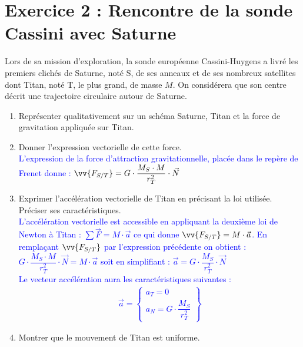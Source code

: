\documentclass[a4paper,12pt]{article}
\begin{document}
\section*{Exercice 2 : Rencontre de la sonde Cassini avec Saturne}
Lors de sa mission d'exploration, la sonde européenne Cassini-Huygens a livré les premiers clichés de Saturne, noté S, de ses anneaux et de ses nombreux satellites dont Titan, noté T, le plus grand, de masse $M$. On considérera que son centre décrit une trajectoire circulaire autour de Saturne.
\begin{enumerate}
	\item Représenter qualitativement sur un schéma Saturne, Titan et la force de gravitation appliquée sur Titan.\\
	\item Donner l'expression vectorielle de cette force.\\
\textcolor{blue}{L'expression de la force d'attraction gravitationnelle, placée dans le repère de Frenet donne : $\vv{F_{S/T}} = G \cdot \dfrac{M_S \cdot M}{r_T^2} \cdot \vec{N}$}
	\item Exprimer l'accélération vectorielle de Titan en précisant la loi utilisée. Préciser ses caractéristiques.\\
\textcolor{blue}{L'accélération vectorielle est accessible en appliquant la deuxième loi de Newton à Titan : $\sum \vec{F}= M \cdot \vec{a}$ ce qui donne $\vv{F_{S/T}}= M \cdot \vec{a}$. En remplaçant $\vv{F_{S/T}}$ par l'expression précédente on obtient : $G \cdot \dfrac{M_S \cdot M}{r_T^2} \cdot \vec{N} = M \cdot \vec{a}$ soit en simplifiant : $\vec{a} = G \cdot \dfrac{M_S }{r_T^2} \cdot \vec{N}$\\
Le vecteur accélération aura les caractéristiques suivantes : 
\begin{eqnarray}
	\vec{a} = \left\lbrace
	\begin{array}{l}
	a_T = 0\\
	a_N = G \cdot \dfrac{M_S }{r_T^2}
	\end{array}
	\right\rbrace \nonumber
\end{eqnarray}}
	\item Montrer que le mouvement de Titan est uniforme.\\

\end{enumerate}
\end{document}
